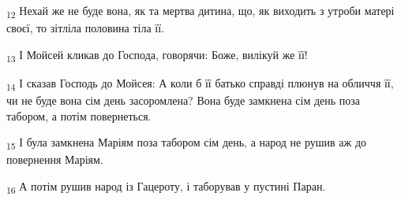 \begin{tcolorbox}
\textsubscript{12} Нехай же не буде вона, як та мертва дитина, що, як виходить з утроби матері своєї, то зітліла половина тіла її.
\end{tcolorbox}
\begin{tcolorbox}
\textsubscript{13} І Мойсей кликав до Господа, говорячи: Боже, вилікуй же її!
\end{tcolorbox}
\begin{tcolorbox}
\textsubscript{14} І сказав Господь до Мойсея: А коли б її батько справді плюнув на обличчя її, чи не буде вона сім день засоромлена? Вона буде замкнена сім день поза табором, а потім повернеться.
\end{tcolorbox}
\begin{tcolorbox}
\textsubscript{15} І була замкнена Маріям поза табором сім день, а народ не рушив аж до повернення Маріям.
\end{tcolorbox}
\begin{tcolorbox}
\textsubscript{16} А потім рушив народ із Гацероту, і таборував у пустині Паран.
\end{tcolorbox}
